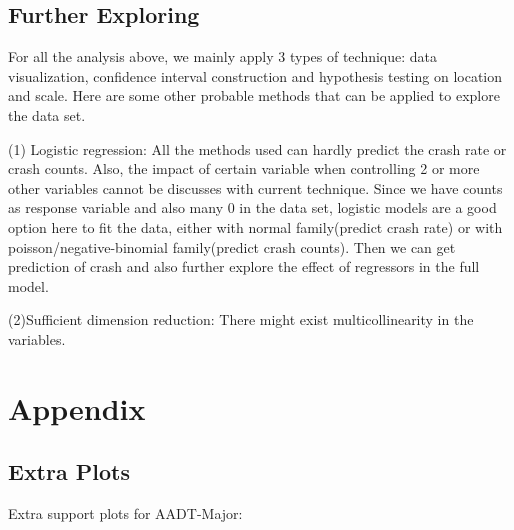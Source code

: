 \documentclass[11pt]{scrartcl} %
\begin{document}
\subsection{Further Exploring}

For all the analysis above, we mainly apply 3 types of technique: data visualization, confidence interval construction and hypothesis testing on location and scale. Here are some other probable methods that can be applied to explore the data set.

(1) Logistic regression: All the methods used can hardly predict the crash rate or crash counts. Also, the impact of certain variable when controlling 2 or more other variables cannot be discusses with current technique. Since we have counts as response variable and also many 0 in the data set, logistic models are a good option here to fit the data, either with normal family(predict crash rate) or with poisson/negative-binomial family(predict crash counts). Then we can get prediction of crash and also further explore the effect of regressors in the full model.

(2)Sufficient dimension reduction: There might exist multicollinearity in the variables.



\section{Appendix}

\subsection{Extra Plots}

Extra support plots for AADT-Major:
\end{document}
